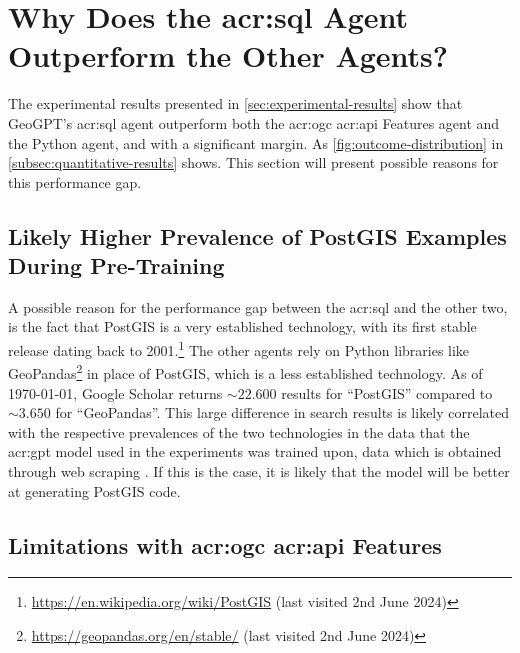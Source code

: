 \section[Why Does the SQL Agent Outperform the Other Agents?]{Why Does the \acrshort{acr:sql} Agent Outperform the Other Agents?}
\label{sec:why-sql-better}

The experimental results presented in \autoref{sec:experimental-results} show that GeoGPT's \acrshort{acr:sql} agent outperform both the \acrshort{acr:ogc} \acrshort{acr:api} Features agent and the Python agent, and with a significant margin. As \autoref{fig:outcome-distribution} in \autoref{subsec:quantitative-results} shows. This section will present possible reasons for this performance gap.

\subsection{Likely Higher Prevalence of PostGIS Examples During Pre-Training}

A possible reason for the performance gap between the \acrshort{acr:sql} and the other two, is the fact that PostGIS is a very established technology, with its first stable release dating back to 2001.\footnote{\url{https://en.wikipedia.org/wiki/PostGIS} (last visited 2nd June 2024)} The other agents rely on Python libraries like GeoPandas\footnote{\url{https://geopandas.org/en/stable/} (last visited 2nd June 2024)} in place of PostGIS, which is a less established technology. As of \today, Google Scholar returns $\sim 22.600$ results for \enquote{PostGIS} compared to  $\sim 3.650$ for \enquote{GeoPandas}. This large difference in search results is likely correlated with the respective prevalences of the two technologies in the data that the \acrshort{acr:gpt} model used in the experiments was trained upon, data which is obtained through web scraping \citep[3]{radfordLanguageModelsAre2019}. If this is the case, it is likely that the model will be better at generating PostGIS code.

\subsection[Limitations with OGC API Features]{Limitations with \acrshort{acr:ogc} \acrshort{acr:api} Features}
\label{subsec:difficulties-with-oaf}

